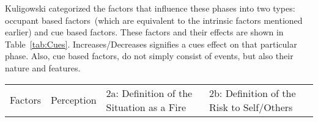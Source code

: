 Kuligowski categorized the factors that influence these phases into two types: occupant based factors~(which are equivalent to the intrinsic factors mentioned earlier) and cue based factors. These factors and their effects are shown in Table~\ref{tab:Cues}. Increases/Decreases signifies a cues effect on that particular phase. Also, cue based factors, do not simply consist of events, but also their nature and features.


\begin{table}[htbp]
\centering
\begin{threeparttable}[b]
\begin{tabular}{m{6.3cm} c >{\centering\arraybackslash}m{2.8cm} >{\centering\arraybackslash}m{2.8cm}} %
\toprule
Factors & Perception  & 2a: Definition of the Situation as a Fire & 2b: Definition of the Risk to Self/Others\\


\end{tabular}
\end{threeparttable}
\end{table}
